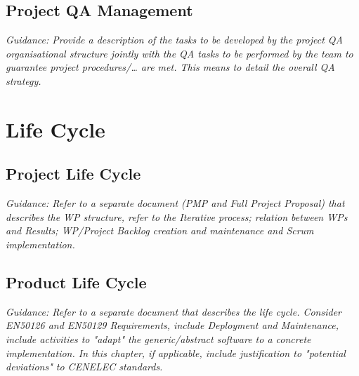 \documentclass{template/openetcs_article}
\begin{document}
\subsection{Project QA Management}
\textit{Guidance: Provide a description of the tasks to be developed by the project  QA organisational structure jointly with the QA tasks to be performed by the team to guarantee project procedures/{\dots} are met. This means to detail the overall QA strategy.}

\section{Life Cycle}



\subsection{Project Life Cycle }



\textit{Guidance: Refer to a separate document (PMP and Full Project Proposal)  that describes the WP structure, refer to  the Iterative process; relation between WPs and Results; WP/Project Backlog creation and maintenance and Scrum implementation.}


\subsection{Product Life Cycle }


\textit{Guidance: Refer to a separate document that describes the life cycle. Consider EN50126 and EN50129 Requirements, include Deployment and Maintenance, include activities to "adapt" the generic/abstract software to a concrete implementation.
In this chapter, if applicable, include justification to "potential deviations" to CENELEC standards.}
\end{document}

